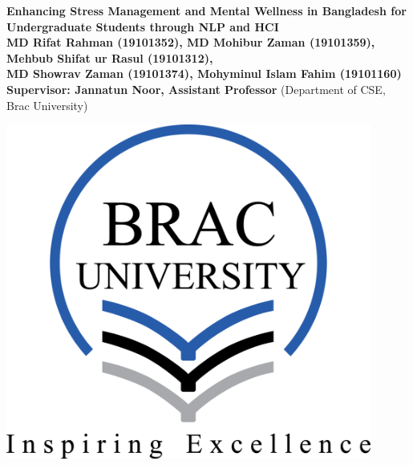 \documentclass[a0,landscape]{a0poster}
\begin{document}
\begin{minipage}[b]{0.80\linewidth}
\veryHuge \color{RoyalBlue} \textbf{Enhancing Stress Management and Mental Wellness in Bangladesh for Undergraduate Students through NLP and HCI} \color{Black}\\ %
\huge \textbf{MD Rifat Rahman (19101352), MD Mohibur Zaman (19101359), Mehbub Shifat ur Rasul (19101312),\\
MD Showrav Zaman (19101374), Mohyminul Islam Fahim (19101160)\\
Supervisor: Jannatun Noor, Assistant Professor} %
\huge (Department of CSE, Brac University) %
\end{minipage}
%
%
\begin{minipage}[b]{0.15\linewidth}
\hspace{0.14\linewidth}
\includegraphics[width=12cm]{figures/bracu_logo.png} %
\end{minipage}
\end{document}
